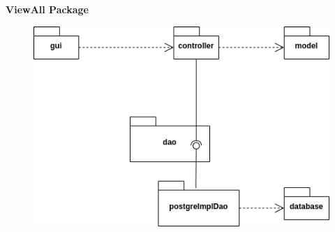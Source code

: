 \bigskip



\newpage

\begin{center}
	\textbf{ViewAll Package}
\end{center}


\newpage

\begin{center}
\end{center}

\begin{figure}[h]
	\includegraphics{res/DOC_OBJECT/onlyPackage.png}
\end{figure}

\newpage




